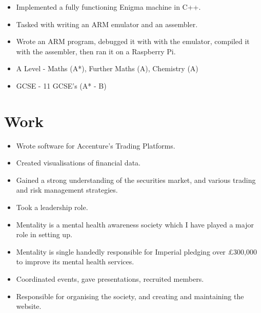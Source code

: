 \documentclass{jcgcv}
\begin{document}
\begin{column}
\begin{adjustwidth}{0.3cm}{}
\begin{itemize}
  \item Implemented a fully functioning Enigma machine in C++.
\end{itemize}

\begin{itemize}
  \item Tasked with writing an ARM emulator and an assembler.
  \item Wrote an ARM program, debugged it with with the emulator, compiled it with the assembler, then ran it on a Raspberry Pi.
\end{itemize}

\end{adjustwidth}
\vspace{10pt}

\begin{itemize}
  \item A Level - Maths (A*), Further Maths (A), Chemistry (A)
  \item GCSE - 11 GCSE’s (A* - B)
\end{itemize}



\section{Work}

\begin{itemize}
  \item Wrote software for Accenture’s Trading Platforms.
  \item Created visualisations of financial data.
  \item Gained a strong understanding of the securities market, and various trading and risk management strategies.
  \item Took a leadership role.
\end{itemize}

\begin{itemize}
  \item Mentality is a mental health awareness society which I have played a major role in setting up.
  \item Mentality is single handedly responsible for Imperial pledging over £300,000 to improve its mental health services.
  \item Coordinated events, gave presentations, recruited members.
  \item Responsible for organising the society, and creating and maintaining the website.
\end{itemize}


\end{column}
\end{document}
